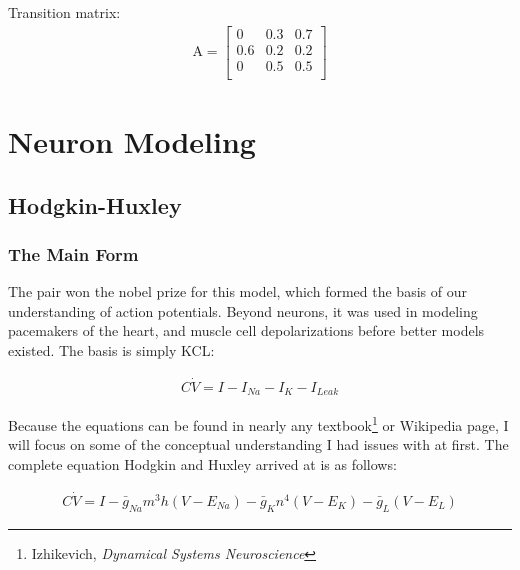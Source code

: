 \documentclass[12pt]{report}
\begin{document}
Transition matrix: 
\begin{align}
\mathrm{A} =
\begin{bmatrix} %
0           &  0.3          & 0.7 \\ 
0.6         &  0.2          & 0.2     \\
0           &   0.5         & 0.5    \\ 
\end{bmatrix}
\end{align}

\chapter{Neuron Modeling}

\section{Hodgkin-Huxley} 

\subsection{The Main Form} The pair won the nobel prize for this model, which formed the basis of our understanding of action potentials. Beyond neurons, it was used in modeling pacemakers of the heart, and muscle cell depolarizations before better models existed.  The basis is simply KCL: 

\bigskip

\begin{equation} \label{eq8}
\begin{split}
C\dot{V} = I - I_{Na} - I_{K} - I_{Leak}
\end{split}
\end{equation}

\bigskip

Because the equations can be found in nearly any textbook\footnote{Izhikevich, \textit{Dynamical Systems Neuroscience}} or Wikipedia page, I will focus on some of the conceptual understanding I had issues with at first. The complete equation Hodgkin and Huxley arrived at is as follows: 

\bigskip

\begin{equation} \label{eq8}
\begin{split}
C\dot{V} = I - \bar{g}_{Na}m^3h(V - E_{Na}) - \bar{g}_{K}n^4(V - E_{K}) - \bar{g}_{L}(V - E_{L})
\end{split}
\end{equation}
\end{document}

